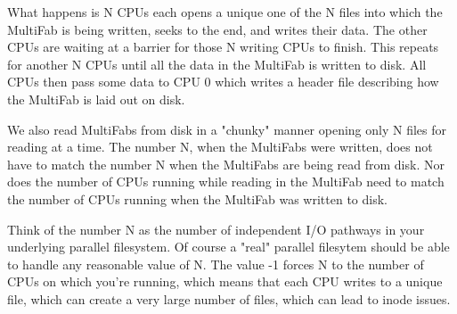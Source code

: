 What happens is N CPUs each opens a unique one of the N files into which the MultiFab is 
being written, seeks to the end, and writes their data.  The other CPUs are waiting at a 
barrier for those N writing CPUs to finish.  This repeats for another N CPUs until all the 
data in the MultiFab is written to disk.  All CPUs then pass some data to CPU 0 which writes 
a header file describing how the MultiFab is laid out on disk.

We also read MultiFabs from disk in a "chunky" manner opening only N files for reading at a 
time.  The number N, when the MultiFabs were written, does not have to match the number N when 
the MultiFabs are being read from disk.  Nor does the number of CPUs running while reading in 
the MultiFab need to match the number of CPUs running when the MultiFab was written to disk.

Think of the number N as the number of independent I/O pathways in your underlying parallel 
filesystem.  Of course a "real" parallel filesytem should be able to handle any reasonable 
value of N.  The value -1 forces N to the number of CPUs on which you're running, which means 
that each CPU writes to a unique file, which can create a very large number of files, which 
can lead to inode issues.
